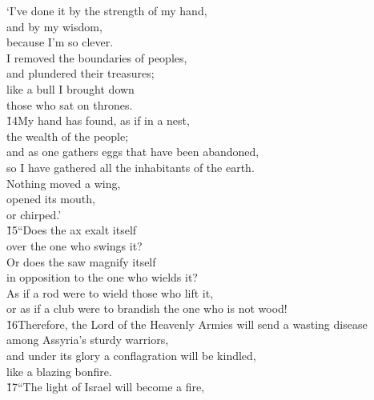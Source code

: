 \begin{poetry}
\poeml `I've done it by the strength of my hand, \\
\poemll    and by my wisdom, \\
\poemlll       because I'm so clever. \\
\poeml I removed the boundaries of peoples, \\
\poemll    and plundered their treasures; \\
\poeml like a bull I brought down \\
\poemll    those who sat on thrones. \\
\poeml \v{14}My hand has found, as if in a nest, \\
\poemll    the wealth of the people; \\
\poeml and as one gathers eggs that have been abandoned, \\
\poemll    so I have gathered all the inhabitants of the earth. \\
\poeml Nothing moved a wing, \\
\poemll    opened its mouth, \\
\poemlll       or chirped.' \\
\poeml \v{15}``Does the ax exalt itself \\
\poemll    over the one who swings it? \\
\poeml Or does the saw magnify itself \\
\poemll    in opposition to the one who wields it? \\
\poeml As if a rod were to wield those who lift it, \\
\poemll    or as if a club were to brandish the one who is not wood! \\
\poeml \v{16}Therefore, the Lord  of the Heavenly Armies will send a wasting disease \\
\poemll    among Assyria's sturdy warriors, \\
\poeml and under its glory a conflagration will be kindled, \\
\poemll    like a blazing bonfire. \\
\poeml \v{17}``The light of Israel will become a fire, \\

\end{poetry}
